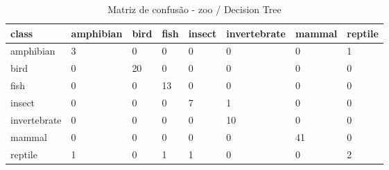 \begin{table}[htbp]
\centering
\begin{tabular}{llllllll}
\hline
class & amphibian & bird & fish & insect & invertebrate & mammal & reptile \\
\hline
amphibian & 3 & 0 & 0 & 0 & 0 & 0 & 1 \\
bird & 0 & 20 & 0 & 0 & 0 & 0 & 0 \\
fish & 0 & 0 & 13 & 0 & 0 & 0 & 0 \\
insect & 0 & 0 & 0 & 7 & 1 & 0 & 0 \\
invertebrate & 0 & 0 & 0 & 0 & 10 & 0 & 0 \\
mammal & 0 & 0 & 0 & 0 & 0 & 41 & 0 \\
reptile & 1 & 0 & 1 & 1 & 0 & 0 & 2 \\
\hline
\end{tabular}
\caption{Matriz de confusão - zoo / Decision Tree}
\label{tab:ex3-zoo-decision-tree-cm}
\end{table}